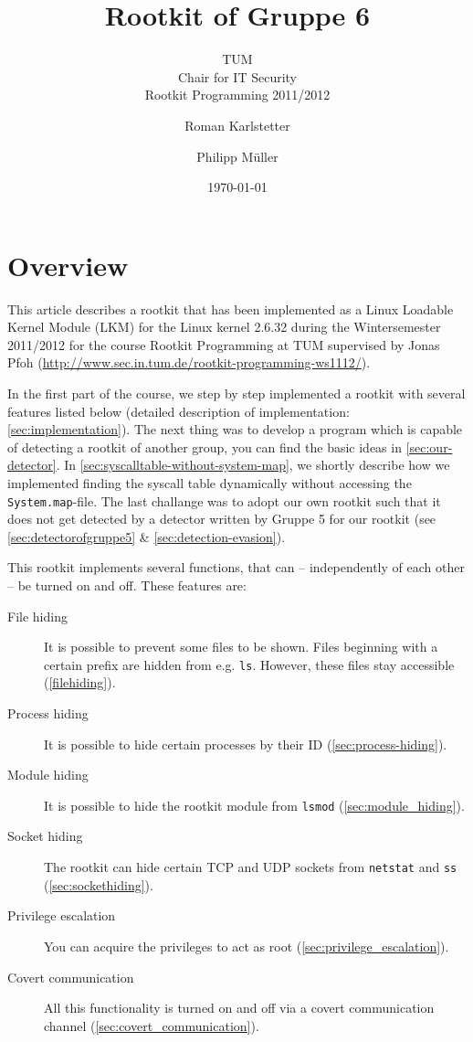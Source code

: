 \documentclass[10pt, letterpaper]{scrartcl}
\title{Rootkit of Gruppe 6}
\subtitle{TUM \\Chair for IT Security\\  Rootkit Programming 2011/2012}
\author{Roman Karlstetter \and Philipp M\"uller}
\date{\today}
\begin{document}
\maketitle
\tableofcontents
\newpage

\section{Overview}
This article describes a rootkit that has been implemented as a Linux Loadable Kernel Module (LKM) for the Linux kernel 2.6.32 during the Wintersemester 2011/2012 for the course Rootkit Programming at TUM supervised by Jonas Pfoh (\url{http://www.sec.in.tum.de/rootkit-programming-ws1112/}). 

In the first part of the course, we step by step implemented a rootkit with several features listed below (detailed description of implementation: \autoref{sec:implementation}). The next thing was to develop a program which is capable of detecting a rootkit of another group, you can find the basic ideas in \autoref{sec:our-detector}. In \autoref{sec:syscalltable-without-system-map}, we shortly describe how we implemented finding the syscall table dynamically without accessing the \texttt{System.map}-file. The last challange was to adopt our own rootkit such that it does not get detected by a detector written by Gruppe 5 for our rootkit (see \autoref{sec:detectorofgruppe5} \& \autoref{sec:detection-evasion}).

This rootkit implements several functions, that can -- independently of each other -- be turned on and off. These features are:

\begin{description}
\item [File hiding] It is possible to prevent some files to be shown. Files beginning with a certain prefix are hidden from e.g. \texttt{ls}. However, these files stay accessible (\autoref{filehiding}).
\item [Process hiding] It is possible to hide certain processes by their ID (\autoref{sec:process-hiding}).
\item [Module hiding] It is possible to hide the rootkit module from \texttt{lsmod} (\autoref{sec:module_hiding}).
\item [Socket hiding] The rootkit can hide certain TCP and UDP sockets from \texttt{netstat} and \texttt{ss} (\autoref{sec:sockethiding}).
\item [Privilege escalation] You can acquire the privileges to act as root (\autoref{sec:privilege_escalation}).
\item [Covert communication] All this functionality is turned on and off via a covert communication channel (\autoref{sec:covert_communication}).
\end{description}
\end{document}
